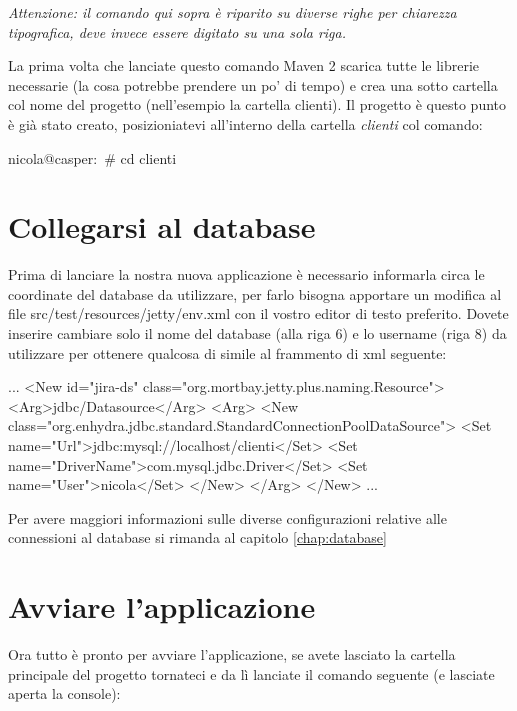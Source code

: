\emph{Attenzione: il comando qui sopra è riparito su diverse righe per chiarezza tipografica, deve invece essere digitato su una sola riga.}

La prima volta che lanciate questo comando Maven 2 scarica tutte le librerie necessarie (la cosa potrebbe prendere un po' di tempo) e crea una sotto cartella col nome del progetto (nell'esempio la cartella clienti). Il progetto è questo punto è già stato creato, posizioniatevi all'interno della cartella  \emph{clienti} col comando:

\begin{bash}
nicola@casper:~# cd clienti
\end{bash}


\section{Collegarsi al database}\label{sec:db-link}

Prima di lanciare la nostra nuova applicazione è necessario informarla circa le coordinate del database da utilizzare, per farlo bisogna apportare un modifica al file src/test/resources/jetty/env.xml con il vostro editor di testo preferito. Dovete inserire cambiare solo il nome del database (alla riga 6) e lo username (riga 8) da utilizzare per ottenere qualcosa di simile al frammento di xml seguente:

\begin{xml}
...
<New id="jira-ds" class="org.mortbay.jetty.plus.naming.Resource">
  <Arg>jdbc/Datasource</Arg>
  <Arg>
    <New class="org.enhydra.jdbc.standard.StandardConnectionPoolDataSource">
      <Set name="Url">jdbc:mysql://localhost/clienti</Set>
      <Set name="DriverName">com.mysql.jdbc.Driver</Set>
      <Set name="User">nicola</Set>
    </New>
  </Arg>
</New>
...
\end{xml}

\begin{nota}
Per avere maggiori informazioni sulle diverse configurazioni relative alle connessioni al database si rimanda al capitolo \ref{chap:database}
\end{nota}


\section{Avviare l'applicazione}
Ora tutto è pronto per avviare l'applicazione, se avete lasciato la cartella principale del progetto tornateci e da lì lanciate il comando seguente (e lasciate aperta la console):

